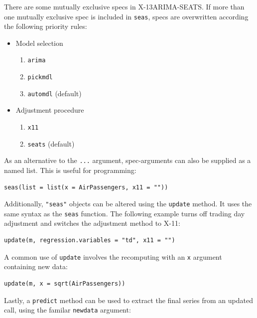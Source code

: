 There are some mutually exclusive specs in X-13ARIMA-SEATS. If more than
one mutually exclusive spec is included in \texttt{seas}, specs are
overwritten according the following priority rules:

\begin{itemize}
\itemsep1pt\parskip0pt
\item
  Model selection

  \begin{enumerate}
  \def\labelenumi{\arabic{enumi}.}
  \itemsep1pt\parskip0pt
  \item
    \texttt{arima}
  \item
    \texttt{pickmdl}
  \item
    \texttt{automdl} (default)
  \end{enumerate}
\item
  Adjustment procedure

  \begin{enumerate}
  \def\labelenumi{\arabic{enumi}.}
  \itemsep1pt\parskip0pt
  \item
    \texttt{x11}
  \item
    \texttt{seats} (default)
  \end{enumerate}
\end{itemize}

As an alternative to the \texttt{...} argument, spec-arguments can also
be supplied as a named list. This is useful for programming:

\begin{verbatim}
seas(list = list(x = AirPassengers, x11 = ""))
\end{verbatim}

Additionally, \texttt{"seas"} objects can be altered using the
\texttt{update} method. It uses the same syntax as the \texttt{seas}
function. The following example turns off trading day adjustment and
switches the adjustment method to X-11:

\begin{verbatim}
update(m, regression.variables = "td", x11 = "")
\end{verbatim}

A common use of \texttt{update} involves the recomputing with an
\texttt{x} argument containing new data:

\begin{verbatim}
update(m, x = sqrt(AirPassengers))
\end{verbatim}

Lastly, a \texttt{predict} method can be used to extract the final
series from an updated call, using the familar \texttt{newdata}
argument:

